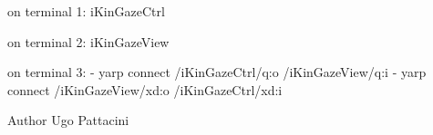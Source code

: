 \begin{DoxyCode}
on terminal 1: iKinGazeCtrl 
 
on terminal 2: iKinGazeView 
 
on terminal 3: 
- yarp connect /iKinGazeCtrl/q:o  /iKinGazeView/q:i 
- yarp connect /iKinGazeView/xd:o /iKinGazeCtrl/xd:i 
\end{DoxyCode}


\begin{DoxyAuthor}{Author}
Ugo Pattacini 
\end{DoxyAuthor}
